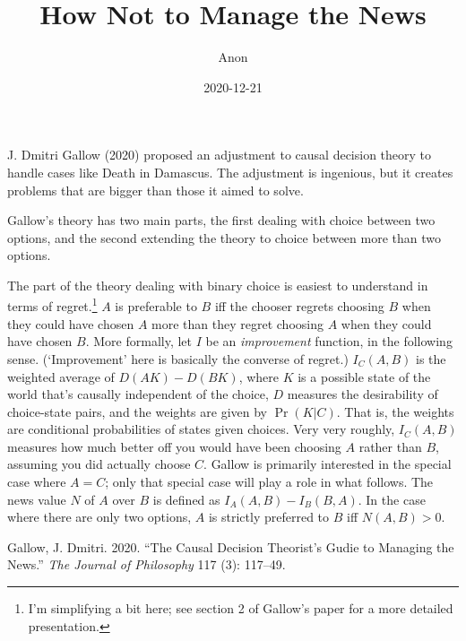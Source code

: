\documentclass[
  12pt,
]{article}
\title{How Not to Manage the News}
\author{Anon}
\date{2020-12-21}
\begin{document}
\maketitle

J. Dmitri Gallow (2020) proposed an adjustment to causal decision theory
to handle cases like Death in Damascus. The adjustment is ingenious, but
it creates problems that are bigger than those it aimed to solve.

Gallow's theory has two main parts, the first dealing with choice
between two options, and the second extending the theory to choice
between more than two options.

The part of the theory dealing with binary choice is easiest to
understand in terms of regret.\footnote{I'm simplifying a bit here; see
  section 2 of Gallow's paper for a more detailed presentation.} \(A\)
is preferable to \(B\) iff the chooser regrets choosing \(B\) when they
could have chosen \(A\) more than they regret choosing \(A\) when they
could have chosen \(B\). More formally, let \(I\) be an
\emph{improvement} function, in the following sense. (`Improvement' here
is basically the converse of regret.) \(I_C(A, B)\) is the weighted
average of \(D(AK) - D(BK)\), where \(K\) is a possible state of the
world that's causally independent of the choice, \(D\) measures the
desirability of choice-state pairs, and the weights are given by
\(\Pr(K | C)\). That is, the weights are conditional probabilities of
states given choices. Very very roughly, \(I_C(A, B)\) measures how much
better off you would have been choosing \(A\) rather than \(B\),
assuming you did actually choose \(C\). Gallow is primarily interested
in the special case where \(A = C\); only that special case will play a
role in what follows. The news value \(N\) of \(A\) over \(B\) is
defined as \(I_A(A, B) - I_B(B, A)\). In the case where there are only
two options, \(A\) is strictly preferred to \(B\) iff \(N(A, B) > 0\).

\hypertarget{refs}{}
\leavevmode\hypertarget{ref-Gallow2020}{}%
Gallow, J. Dmitri. 2020. ``The Causal Decision Theorist's Gudie to
Managing the News.'' \emph{The Journal of Philosophy} 117 (3): 117--49.
\end{document}
